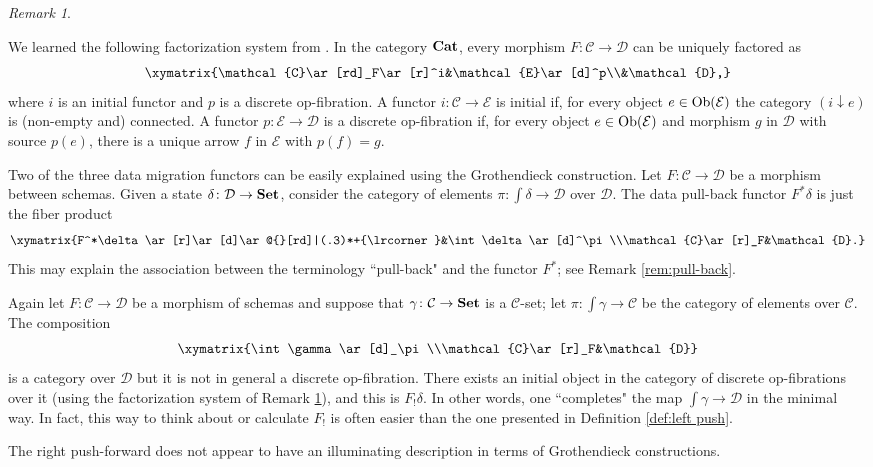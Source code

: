 \documentclass{amsart}
\makeatletter
\def\tn{\textnormal}
\def\mc{\mathcal}
\def\Ob{\tn{Ob}}
\def\to{\rightarrow}
\def\taking{\colon}
\def\down{\downarrow}
\def\ullimit{\ar@{}[rd]|(.3)*+{\lrcorner}}
\def\Cat{{\bf Cat}}
\def\Set{{\bf Set}}
\def\mcC{\mc{C}}
\def\mcD{\mc{D}}
\def\mcE{\mc{E}}
\theoremstyle{remark}
\newtheorem{remark}[theorem]{Remark}
\theoremstyle{definition}
\makeatother
\begin{document}
\begin{remark}\label{rem:factorization}

We learned the following factorization system from \cite{Joy}.  In the category $\Cat$, every morphism $F\taking\mcC\to\mcD$ can be uniquely factored as $$\xymatrix{\mcC\ar[rd]_F\ar[r]^i&\mcE\ar[d]^p\\&\mcD,}$$ where $i$ is an initial functor and $p$ is a discrete op-fibration.  A functor $i\taking\mcC\to\mcE$ is initial if, for every object $e\in\Ob(\mcE)$ the category $(i\down e)$ is (non-empty and) connected.  A functor $p\taking \mcE\to\mcD$ is a discrete op-fibration if, for every object $e\in\Ob(\mcE)$ and morphism $g$ in $\mcD$ with source $p(e)$, there is a unique arrow $f$ in $\mcE$ with $p(f)=g$.

\end{remark}

Two of the three data migration functors can be easily explained using the Grothendieck construction.  Let $F\taking\mcC\to\mcD$ be a morphism between schemas.  Given a state $\delta\taking\mcD\to\Set$, consider the category of elements $\pi\taking\int\delta\to\mcD$ over $\mcD$.  The data pull-back functor $F^*\delta$ is just the fiber product $$\xymatrix{F^*\delta\ar[r]\ar[d]\ullimit&\int\delta\ar[d]^\pi\\\mcC\ar[r]_F&\mcD.}$$  This may explain the association between the terminology ``pull-back" and the functor $F^*$; see Remark \ref{rem:pull-back}.

Again let $F\taking\mcC\to\mcD$ be a morphism of schemas and suppose that $\gamma\taking\mcC\to\Set$ is a $\mcC$-set; let $\pi\taking\int\gamma\to\mcC$ be the  category of elements over $\mcC$.  The composition $$\xymatrix{\int\gamma\ar[d]_\pi\\\mcC\ar[r]_F&\mcD}$$ is a category over $\mcD$ but it is not in general a discrete op-fibration.  There exists an initial object in the category of discrete op-fibrations over it (using the factorization system of Remark \ref{rem:factorization}), and this is $F_!\delta$.  In other words, one ``completes" the map $\int\gamma\to\mcD$ in the minimal way.  In fact, this way to think about or calculate $F_!$ is often easier than the one presented in Definition \ref{def:left push}.

The right push-forward does not appear to have an illuminating description in terms of Grothendieck constructions.
\end{document}
